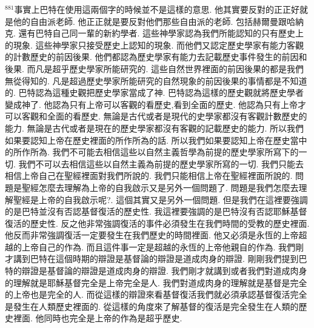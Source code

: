 \documentclass{book}
\begin{document}
$^{881}$事實上巴特在使用這兩個字的時候並不是這樣的意思.
他其實要反對的正正好就是他的自由派老師.
他正正就是要反對他們那些自由派的老師.
包括赫爾曼跟哈納克.
還有巴特自己同一輩的新約學者.
這些神學家認為我們所能認知的只有歷史上的現象.
這些神學家只接受歷史上認知的現象.
而他們又認定歷史學家有能力客觀的計數歷史的前因後果.
他們都認為歷史學家有能力去記載歷史事件發生的前因和後果.
而凡是超乎歷史學家所能研究的.
這些自然世界裡面的前因後果的都是我們無從得知的.
凡是超過歷史學家所能研究的自然現象的前因後果的事情都是不知道的.
巴特認為這種史觀把歷史學家當成了神.
巴特認為這樣的歷史觀就將歷史學者變成神了.
他認為只有上帝可以客觀的看歷史,看到全面的歷史.
他認為只有上帝才可以客觀和全面的看歷史.
無論是古代或者是現代的史學家都沒有客觀計數歷史的能力.
無論是古代或者是現在的歷史學家都沒有客觀的記載歷史的能力.
所以我們如果要認知上帝在歷史裡面的所作所為的話.
所以我們如果要認知上帝在歷史當中的所作所為.
我們不可能去相信這些以自然主義哲學為前提的歷史學家所寫下的一切.
我們不可以去相信這些以自然主義為前提的歷史學家所寫的一切.
我們只能去相信上帝自己在聖經裡面對我們所說的.
我們只能相信上帝在聖經裡面所說的.
問題是聖經怎麼去理解為上帝的自我啟示又是另外一個問題了.
問題是我們怎麼去理解聖經是上帝的自我啟示呢?.
這個其實又是另外一個問題.
但是我們在這裡要強調的是巴特並沒有否認基督復活的歷史性.
我這裡要強調的是巴特沒有否認耶穌基督復活的歷史性.
反之他非常強調復活的事件必須發生在我們時間的受教的歷史裡面.
他反而非常強調復活一定要發生在我們歷史的時間裡面.
他又必須是永恆的上帝超越的上帝自己的作為.
而且這件事一定是超越的永恆的上帝他親自的作為.
我們剛才講到巴特在這個時期的辯證是基督論的辯證是道成肉身的辯證.
剛剛我們提到巴特的辯證是基督論的辯證是道成肉身的辯證.
我們剛才就講到或者我們對道成肉身的理解就是耶穌基督完全是上帝完全是人.
我們對道成肉身的理解就是基督是完全的上帝也是完全的人.
而從這樣的辯證來看基督復活我們就必須承認基督復活完全是發生在人類歷史裡面的.
從這樣的角度來了解基督的復活是完全發生在人類的歷史裡面.
他同時也完全是上帝的作為是超乎歷史.
\end{document}
